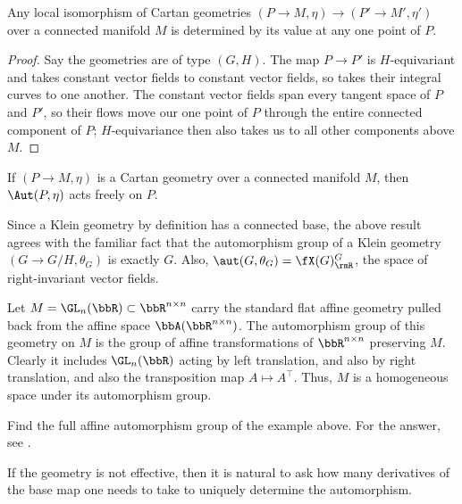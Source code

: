 \begin{thm}
    Any local isomorphism of Cartan geometries $(P\to M,\eta)\to (P'\to M',\eta')$ over a connected manifold $M$ is determined by its value at any one point of $P$.
\end{thm}
\begin{proof}
    Say the geometries are of type $(G,H)$. The map $P\to P'$ is $H$-equivariant and takes constant vector fields to constant vector fields, so takes their integral curves to one another. The constant vector fields span every tangent space of $P$ and $P'$, so their flows move our one point of $P$ through the entire connected component of $P$; $H$-equivariance then also takes us to all other components above $M$.
\end{proof}
\begin{cor}
    If $(P\to M,\eta)$ is a Cartan geometry over a connected manifold $M$, then $\Aut(P,\eta)$ acts freely on $P$.
\end{cor}

\begin{example}
    Since a Klein geometry by definition has a connected base, the above result agrees with the familiar fact that the automorphism group of a Klein geometry $(G\to G\slash H,\theta_G)$ is exactly $G$. Also, $\aut(G,\theta_G)=\fX(G)^G_\rmR$, the space of right-invariant vector fields.
\end{example}

\begin{example}
    Let $M=\GL_n(\bbR)\subset \bbR^{n\times n}$ carry the standard flat affine geometry pulled back from the affine space $\bbA(\bbR^{n\times n})$. The automorphism group of this geometry on $M$ is the group of affine transformations of $\bbR^{n\times n}$ preserving $M$. Clearly it includes $\GL_n(\bbR)$ acting by left translation, and also by right translation, and also the transposition map $A\mapsto A^\top $. Thus, $M$ is a homogeneous space under its automorphism group.
\end{example}

\begin{xca}
    Find the full affine automorphism group of the example above. For the answer, see \cite{Dieudonne}.
\end{xca}

If the geometry is not effective, then it is natural to ask how many derivatives of the base map one needs to take to uniquely determine the automorphism.

